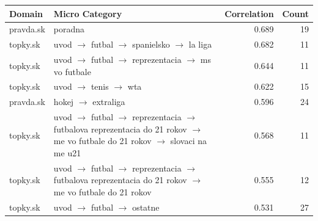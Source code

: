 \documentclass[11pt,a4paper]{article}
\begin{document}
\begin{table}[H]
	\centering
	\small
	\begin{tabular}{@{}lp{9cm}rr@{}}
		\toprule
		\textbf{Domain} & \textbf{Micro Category}                                                                                                                                                         & \textbf{Correlation} & \textbf{Count} \\ \midrule
		pravda.sk       & poradna                                                                                                                                                                         & 0.689                & 19             \\
		topky.sk        & uvod $\rightarrow$ futbal $\rightarrow$ spanielsko $\rightarrow$ la liga                                                                                                        & 0.682                & 11             \\
		topky.sk        & uvod $\rightarrow$ futbal $\rightarrow$ reprezentacia $\rightarrow$ ms vo futbale                                                                                               & 0.644                & 11             \\
		topky.sk        & uvod $\rightarrow$ tenis $\rightarrow$ wta                                                                                                                                      & 0.622                & 15             \\
		pravda.sk       & hokej $\rightarrow$ extraliga                                                                                                                                                   & 0.596                & 24             \\
		topky.sk        & uvod $\rightarrow$ futbal $\rightarrow$ reprezentacia $\rightarrow$ futbalova reprezentacia do 21 rokov $\rightarrow$ me vo futbale do 21 rokov $\rightarrow$ slovaci na me u21 & 0.568                & 11             \\
		topky.sk        & uvod $\rightarrow$ futbal $\rightarrow$ reprezentacia $\rightarrow$ futbalova reprezentacia do 21 rokov $\rightarrow$ me vo futbale do 21 rokov                                 & 0.555                & 12             \\
		topky.sk        & uvod $\rightarrow$ futbal $\rightarrow$ ostatne                                                                                                                                 & 0.531                & 27             \\

\end{tabular}
\end{table}
\end{document}
